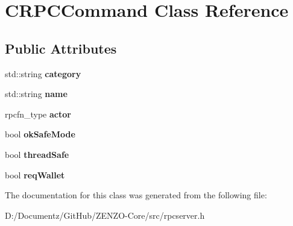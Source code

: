 \hypertarget{class_c_r_p_c_command}{}\section{C\+R\+P\+C\+Command Class Reference}
\label{class_c_r_p_c_command}
\subsection*{Public Attributes}
\begin{DoxyCompactItemize}
\item 
\mbox{\label{class_c_r_p_c_command_a27dd2710a5f94011f891f6a2efcec53a}} 
std\+::string {\bfseries category}
\item 
\mbox{\label{class_c_r_p_c_command_a8da584c0d2d98be22ebff74d3cf2221c}} 
std\+::string {\bfseries name}
\item 
\mbox{\label{class_c_r_p_c_command_a197a7eba565b4d9673537655fcbc1344}} 
rpcfn\+\_\+type {\bfseries actor}
\item 
\mbox{\label{class_c_r_p_c_command_a7f0b10e619917a3019f36ba5fa538adb}} 
bool {\bfseries ok\+Safe\+Mode}
\item 
\mbox{\label{class_c_r_p_c_command_a0377f0b0f803b3698121f3a2b35d67b1}} 
bool {\bfseries thread\+Safe}
\item 
\mbox{\label{class_c_r_p_c_command_a15bd6eb3af57f6382f15b2e927fdd445}} 
bool {\bfseries req\+Wallet}
\end{DoxyCompactItemize}


The documentation for this class was generated from the following file\+:\begin{DoxyCompactItemize}
\item 
D\+:/\+Documentz/\+Git\+Hub/\+Z\+E\+N\+Z\+O-\/\+Core/src/rpcserver.\+h\end{DoxyCompactItemize}
